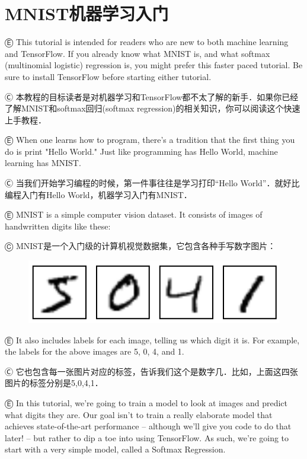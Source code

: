


\newpage
\section {MNIST机器学习入门}\label{MINIST_beginner}

Ⓔ \textcolor{etc}{This tutorial is intended for readers who are new to both machine learning and TensorFlow. If you already know what MNIST is, and what softmax (multinomial logistic) regression is, you might prefer this faster paced tutorial. Be sure to install TensorFlow before starting either tutorial.}

Ⓒ 本教程的目标读者是对机器学习和TensorFlow都不太了解的新手．如果你已经了解MNIST和softmax回归(softmax regression)的相关知识，你可以阅读这个快速上手教程．

Ⓔ \textcolor{etc}{When one learns how to program, there's a tradition that the first thing you do is print "Hello World." Just like programming has Hello World, machine learning has MNIST.}

Ⓒ 当我们开始学习编程的时候，第一件事往往是学习打印“Hello World”．就好比编程入门有Hello World，机器学习入门有MNIST．

Ⓔ \textcolor{etc}{MNIST is a simple computer vision dataset. It consists of images of handwritten digits like these:}

Ⓒ MNIST是一个入门级的计算机视觉数据集，它包含各种手写数字图片：

\begin{figure}[htbp]
\centering
\includegraphics[width=.55\textwidth]{../SOURCE/images/MNIST.png}
\caption{}
\end{figure}

Ⓔ \textcolor{etc}{It also includes labels for each image, telling us which digit it is. For example, the labels for the above images are 5, 0, 4, and 1.}

Ⓒ 它也包含每一张图片对应的标签，告诉我们这个是数字几．比如，上面这四张图片的标签分别是5,0,4,1．

Ⓔ \textcolor{etc}{In this tutorial, we're going to train a model to look at images and predict what digits they are. Our goal isn't to train a really elaborate model that achieves state-of-the-art performance -- although we'll give you code to do that later! -- but rather to dip a toe into using TensorFlow. As such, we're going to start with a very simple model, called a Softmax Regression.}


